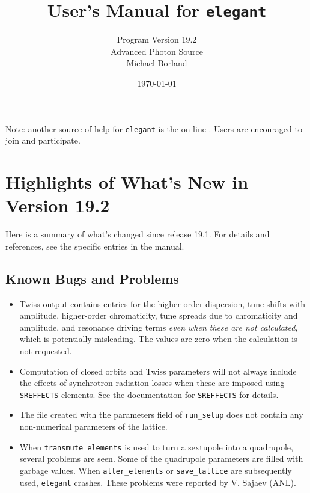 \documentclass[11pt]{article}
\begin{document}
\title{User's Manual for {\tt elegant}}
\author{Program Version 19.2\\Advanced Photon Source\\Michael Borland\\ \date{\today}}
\maketitle

Note: another source of help for {\tt elegant} is the on-line
.
Users are encouraged to join and participate.

\section{Highlights of What's New in Version 19.2}

Here is a summary of what's changed since release 19.1.  For details
and references, see the specific entries in the manual. 

\subsection{Known Bugs and Problems}
\begin{itemize}
\item Twiss output contains entries for the higher-order dispersion, tune
        shifts with amplitude, higher-order chromaticity, tune spreads
        due to chromaticity and amplitude, and resonance driving terms
	{\em even when these are not calculated}, which is potentially
	misleading.   The values are zero when the calculation is not
        requested.
\item Computation of closed orbits and Twiss parameters will not always include the effects of synchrotron
  radiation losses when these are imposed using {\tt SREFFECTS} elements.  See
  the documentation for {\tt SREFFECTS} for details.
\item The file created with the parameters field of \verb|run_setup| does not contain
  any non-numerical parameters of the lattice.
\item When \verb|transmute_elements| is used to turn a sextupole into a quadrupole, several problems are seen.
 Some of the quadrupole parameters are filled with garbage values.  When \verb|alter_elements| or
 \verb|save_lattice| are subsequently used, \verb|elegant| crashes.   These problems were reported by 
 V. Sajaev (ANL).
\end{itemize}
\end{document}
